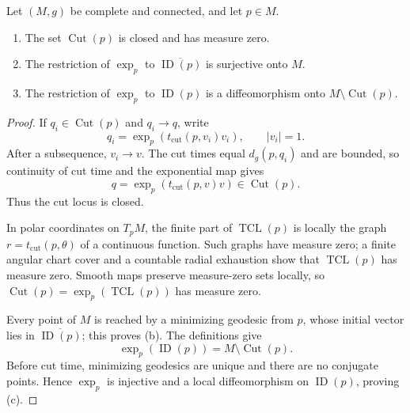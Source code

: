 \begin{theorem}
\label{thm:cut-locus-properties}
Let $(M,g)$ be complete and connected, and let $p\in M$.
\begin{enumerate}
\item[(a)] The set $\operatorname{Cut}(p)$ is closed and has measure zero.
\item[(b)] The restriction of $\exp_p$ to
$\overline{\operatorname{ID}(p)}$ is surjective onto $M$.
\item[(c)] The restriction of $\exp_p$ to $\operatorname{ID}(p)$ is a
diffeomorphism onto $M\setminus\operatorname{Cut}(p)$.
\end{enumerate}

\begin{proof}
\sketch If $q_i\in\operatorname{Cut}(p)$ and $q_i\to q$, write
\[
q_i=\exp_p(t_{\mathrm{cut}}(p,v_i)v_i),
\qquad |v_i|=1.
\]
After a subsequence, $v_i\to v$. The cut times equal $d_g(p,q_i)$ and are
bounded, so continuity of cut time and the exponential map gives
\[
q=\exp_p(t_{\mathrm{cut}}(p,v)v)\in\operatorname{Cut}(p).
\]
Thus the cut locus is closed.

In polar coordinates on $T_pM$, the finite part of
$\operatorname{TCL}(p)$ is locally the graph
$r=t_{\mathrm{cut}}(p,\theta)$ of a continuous function. Such graphs have
measure zero; a finite angular chart cover and a countable radial exhaustion
show that $\operatorname{TCL}(p)$ has measure zero. Smooth maps preserve
measure-zero sets locally, so
$\operatorname{Cut}(p)=\exp_p(\operatorname{TCL}(p))$ has measure zero.

Every point of $M$ is reached by a minimizing geodesic from $p$, whose initial
vector lies in $\overline{\operatorname{ID}(p)}$; this proves (b). The
definitions give
\[
\exp_p(\operatorname{ID}(p))=M\setminus\operatorname{Cut}(p).
\]
Before cut time, minimizing geodesics are unique and there are no conjugate
points. Hence $\exp_p$ is injective and a local diffeomorphism on
$\operatorname{ID}(p)$, proving (c).
\end{proof}
\end{theorem}

